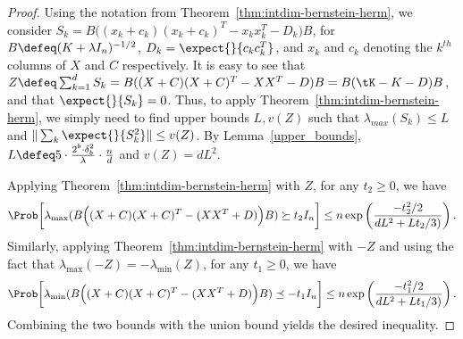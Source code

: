 \begin{proof}
	Using the notation from Theorem~\ref{thm:intdim-bernstein-herm},
	we consider $S_k = B\Big((x_k + c_k)(x_k + c_k)^T  - x_k x_k^T - D_k\Big)B$, for $B\defeq (K+\lambda I_n)^{-1/2}$, $D_k = \expect{}{c_k c_k^T}$, and $x_k$ and $c_k$ denoting the $k^{th}$ columns of $X$ and $C$ respectively.
	It is easy to see that $Z\defeq \sum_{k=1}^d S_k = B((X+C)(X+C)^T - XX^T - D)B = B(\tK - K - D)B$, and that $\expect{}{S_k} = 0$.
	Thus, to apply Theorem~\ref{thm:intdim-bernstein-herm}, we simply need to find upper bounds $L,v(Z)$ such that $\lambda_{max}(S_k) \leq L$ and  $\|\sum_k \expect{}{S_k^2}\| \leq v(Z)$.
	By Lemma~\ref{upper_bounds}, $L \defeq 5 \cdot \frac{2^b \cdot \delta_b^2}{\lambda}\cdot  \frac{n}{d}$ and $v(Z) = dL^2$.
	
	Applying Theorem~\ref{thm:intdim-bernstein-herm} with $Z$, for any $t_2 \geq 0$,
	we have
	\begin{equation*}
	\Prob\bigg[\lambda_{\max}(B\Big((X + C)(X + C)^T - (XX^T+D)\Big)B) \succeq t_2 I_n \bigg] \leq n
	\exp \left( \frac{-t_2^2/2}{dL^2 + Lt_2/3)} \right).
	\end{equation*}
	Similarly, applying Theorem~\ref{thm:intdim-bernstein-herm} with $-Z$ and
	using the fact that $\lambda_{\max}(-Z) = -\lambda_{\min}(Z)$, for any $t_1 \geq 0$,
	we have
	\begin{equation*}
	\Prob\bigg[\lambda_{\min}(B\Big((X + C)(X + C)^T - (XX^T+D)\Big)B) \preceq -t_1 I_n \bigg] \leq n
	\exp \left( \frac{-t_1^2/2}{dL^2 + Lt_1/3)} \right).
	\end{equation*}
	Combining the two bounds with the union bound yields the desired inequality.
\end{proof}


